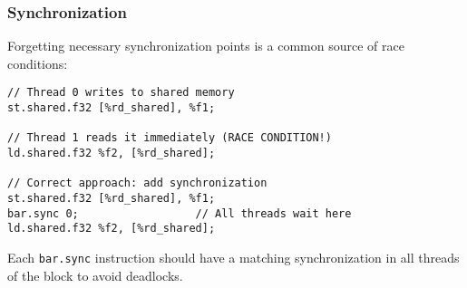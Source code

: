 \subsubsection{Synchronization}

Forgetting necessary synchronization points is a common source of race conditions:

\begin{lstlisting}[style=ptx]
// Thread 0 writes to shared memory
st.shared.f32 [%rd_shared], %f1;

// Thread 1 reads it immediately (RACE CONDITION!)
ld.shared.f32 %f2, [%rd_shared];

// Correct approach: add synchronization
st.shared.f32 [%rd_shared], %f1;
bar.sync 0;                  // All threads wait here
ld.shared.f32 %f2, [%rd_shared];
\end{lstlisting}

Each \texttt{bar.sync} instruction should have a matching synchronization in all threads of the block to avoid deadlocks.

